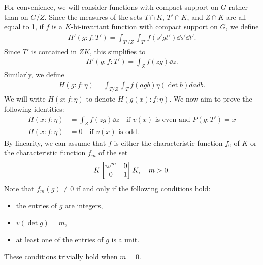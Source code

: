 For convenience, we will consider functions with compact support on $G$ rather than on $G/Z$.
Since the measures of the sets $T \cap K$, $T' \cap K$, and $Z \cap K$ are all equal to 1, if $f$ is a $K$-bi-invariant function with compact support on $G$, we define
\begin{align}
    H'(g:f:T') = \int_{T'/Z} \int_{T'} f(s'gt') \dd s'\dd t'.
\end{align}
Since $T'$ is contained in $ZK$, this simplifies to
\begin{align}
    H'(g:f:T') = \int_{Z} f(zg) \dd z.
\end{align}
Similarly, we define
\begin{align}
    H(g:f:\eta) = \int_{T/Z} \int_{T} f(agb) \eta(\det b) dadb.
\end{align}
We will write $H(x: f: \eta)$ to denote $H(g(x): f: \eta)$.
We now aim to prove the following identities:
\begin{align}
    H(x:f:\eta) &= \int_{Z} f(zg) \dd z \quad \text{if } v(x) \text{ is even and } P(g:T') = x \label{eqn:5.1.4}\\
    H(x:f:\eta) &= 0 \quad \text{if } v(x) \text{ is odd}. \label{eqn:5.1.5}
\end{align}
By linearity, we can assume that $f$ is either the characteristic function $f_0$ of $K$ or the characteristic function $f_m$ of the set
\begin{align}
    K \begin{bmatrix} \varpi^m & 0 \\ 0 & 1 \end{bmatrix}K, \quad m > 0.
\end{align}
Note that $f_m(g) \neq 0$ if and only if the following conditions hold:
\begin{itemize}
    \item the entries of $g$ are integers,
    \item $v(\det g) = m$,
    \item at least one of the entries of $g$ is a unit.
\end{itemize}
These conditions trivially hold when $m = 0$.


